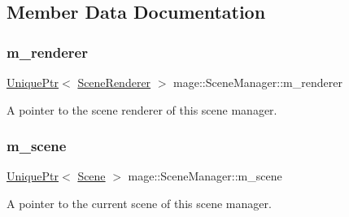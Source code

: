 \subsection{Member Data Documentation}
\hypertarget{classmage_1_1_scene_manager_ac50da0df383825fa3b4627cb42981498}{}\label{classmage_1_1_scene_manager_ac50da0df383825fa3b4627cb42981498} 
\subsubsection{\texorpdfstring{m\+\_\+renderer}{m\_renderer}}
{\footnotesize\ttfamily \hyperlink{namespacemage_a3316d7143a973e37adf1110f2e80ca31}{Unique\+Ptr}$<$ \hyperlink{classmage_1_1_scene_renderer}{Scene\+Renderer} $>$ mage\+::\+Scene\+Manager\+::m\+\_\+renderer\hspace{0.3cm}{\ttfamily [private]}}

A pointer to the scene renderer of this scene manager. \hypertarget{classmage_1_1_scene_manager_a774c610dba3ece25acf97915b6368a1a}{}\label{classmage_1_1_scene_manager_a774c610dba3ece25acf97915b6368a1a} 
\subsubsection{\texorpdfstring{m\+\_\+scene}{m\_scene}}
{\footnotesize\ttfamily \hyperlink{namespacemage_a3316d7143a973e37adf1110f2e80ca31}{Unique\+Ptr}$<$ \hyperlink{classmage_1_1_scene}{Scene} $>$ mage\+::\+Scene\+Manager\+::m\+\_\+scene\hspace{0.3cm}{\ttfamily [private]}}

A pointer to the current scene of this scene manager. 